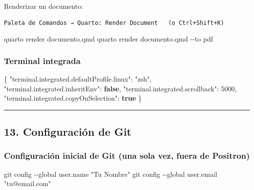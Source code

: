 \documentclass[
  doc,
  floatsintext,
  longtable,
  a4paper,
  nolmodern,
  notxfonts,
  notimes,
  12pt,
  colorlinks=true,linkcolor=blue,citecolor=blue,urlcolor=blue]{apa7}
\newenvironment{Shaded}{\begin{snugshade}}{\end{snugshade}}
\newcommand{\AttributeTok}[1]{\textcolor[rgb]{0.40,0.45,0.13}{#1}}
\newcommand{\DataTypeTok}[1]{\textcolor[rgb]{0.68,0.00,0.00}{#1}}
\newcommand{\DecValTok}[1]{\textcolor[rgb]{0.68,0.00,0.00}{#1}}
\newcommand{\ExtensionTok}[1]{\textcolor[rgb]{0.00,0.23,0.31}{#1}}
\newcommand{\FunctionTok}[1]{\textcolor[rgb]{0.28,0.35,0.67}{#1}}
\newcommand{\KeywordTok}[1]{\textcolor[rgb]{0.00,0.23,0.31}{\textbf{#1}}}
\newcommand{\NormalTok}[1]{\textcolor[rgb]{0.00,0.23,0.31}{#1}}
\newcommand{\StringTok}[1]{\textcolor[rgb]{0.13,0.47,0.30}{#1}}
\begin{document}
Renderizar un documento:

\begin{verbatim}
Paleta de Comandos → Quarto: Render Document   (o Ctrl+Shift+K)
\end{verbatim}

\begin{Shaded}
\begin{Highlighting}[]
\ExtensionTok{quarto}\NormalTok{ render documento.qmd}
\ExtensionTok{quarto}\NormalTok{ render documento.qmd }\AttributeTok{{-}{-}to}\NormalTok{ pdf}
\end{Highlighting}
\end{Shaded}

\subsubsection{Terminal integrada}\label{terminal-integrada}

\begin{Shaded}
\begin{Highlighting}[]
\FunctionTok{\{}
  \DataTypeTok{"terminal.integrated.defaultProfile.linux"}\FunctionTok{:} \StringTok{"zsh"}\FunctionTok{,}
  \DataTypeTok{"terminal.integrated.inheritEnv"}\FunctionTok{:} \KeywordTok{false}\FunctionTok{,}
  \DataTypeTok{"terminal.integrated.scrollback"}\FunctionTok{:} \DecValTok{5000}\FunctionTok{,}
  \DataTypeTok{"terminal.integrated.copyOnSelection"}\FunctionTok{:} \KeywordTok{true}
\FunctionTok{\}}
\end{Highlighting}
\end{Shaded}

\begin{center}\rule{0.5\linewidth}{0.5pt}\end{center}

\subsection{13. Configuración de Git}\label{configuraciuxf3n-de-git}

\subsubsection{Configuración inicial de Git (una sola vez, fuera de
Positron)}\label{configuraciuxf3n-inicial-de-git-una-sola-vez-fuera-de-positron}

\begin{Shaded}
\begin{Highlighting}[]
\FunctionTok{git}\NormalTok{ config }\AttributeTok{{-}{-}global}\NormalTok{ user.name }\StringTok{"Tu Nombre"}
\FunctionTok{git}\NormalTok{ config }\AttributeTok{{-}{-}global}\NormalTok{ user.email }\StringTok{"tu@email.com"}
\end{Highlighting}
\end{Shaded}
\end{document}
